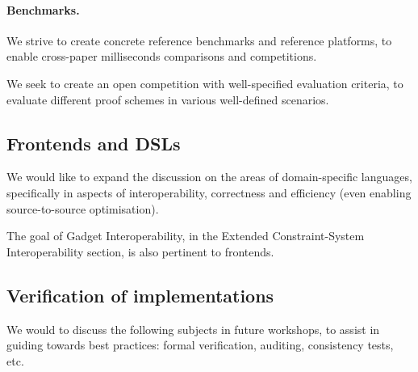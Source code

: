 \paragraph{Benchmarks.}
We strive to create concrete reference benchmarks and reference platforms, to enable cross-paper milliseconds comparisons and competitions.

We seek to create an open competition with well-specified evaluation criteria, to evaluate different proof schemes in various well-defined scenarios.



\subsection{Frontends and DSLs}
We would like to expand the discussion on the areas of domain-specific languages, specifically in aspects of interoperability, correctness and efficiency (even enabling source-to-source optimisation).

The goal of Gadget Interoperability, in the Extended Constraint-System Interoperability section, is also pertinent to frontends.



\subsection{Verification of implementations}
We would to discuss the following subjects in future workshops, to assist in guiding towards best practices: formal verification, auditing, consistency tests, etc.
